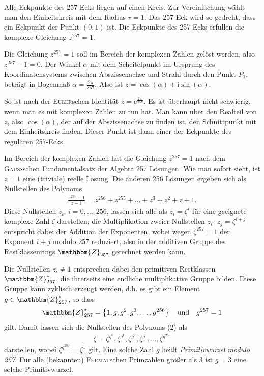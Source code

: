 \documentclass[11pt]{article}
\newcommand{\cbr}[1]{\ensuremath{\left\{#1\right\}}}
\newcommand{\ii}{\mathrm{i}}
\newcommand{\Z}{\mathbbm{Z}}
\begin{document}
Alle Eckpunkte des 257-Ecks liegen auf einen Kreis. Zur Vereinfachung wählt
man den Einheitskreis mit dem Radius $r = 1$. Das 257-Eck wird so gedreht,
dass ein Eckpunkt der Punkt $(0,1)$ ist. Die Eckpunkte des 257-Ecks erfüllen
die komplexe Gleichung $z^{257} = 1$.

Die Gleichung $z^{257} =1$ soll im Bereich der komplexen Zahlen gelöst werden,
also $z^{257} - 1 = 0$. Der Winkel $\alpha$ mit dem Scheitelpunkt im Ursprung
des Koordinatensystems zwischen Abszissenachse und Strahl durch den Punkt
$P_1$, beträgt in Bogenmaß $\alpha= \frac{2\pi}{257}$. Also ist $z =
\cos(\alpha) + \ii\sin(\alpha)$.

So ist nach der \textsc{Euler}schen Identität $z =
\mathrm{e}^{\frac{2\pi\ii}{257}}$.  Es ist überhaupt nicht schwierig, wenn man
es mit komplexen Zahlen zu tun hat. Man kann über den Realteil von $z$, also
$\cos(\alpha)$, der auf der Abszissenachse zu finden ist, den Schnittpunkt mit
dem Einheitskreis finden. Dieser Punkt ist dann einer der Eckpunkte des
regulären 257-Ecks.

Im Bereich der komplexen Zahlen hat die Gleichung $z^{257} = 1$ nach dem
\textsc{Gauss}schen Fundamentalsatz der Algebra 257 Lösungen. Wie man sofort
sieht, ist $z = 1$ eine (triviale) reelle Lösung. Die anderen 256 Lösungen
ergeben sich als Nullstellen des Polynoms
\begin{gather*}
   \frac{z^{257}-1}{z-1}=z^{256}+z^{255}+\ldots+z^3+z^2+z+1.\tag{2}
\end{gather*}
Diese Nullstellen $z_i$, $i=0,\ldots,256$, lassen sich alle als $z_i=\zeta^i$
für eine geeignete komplexe Zahl $\zeta$ darstellen; die Multiplikation zweier
Nullstellen $z_i\cdot z_j=\zeta^{i+j}$ entspricht dabei der Addition der
Exponenten, wobei wegen $\zeta^{257}=1$ der Exponent $i+j$ modulo 257
reduziert, also in der additiven Gruppe des Restklassenrings $\Z_{257}$
gerechnet werden kann.

Die Nullstellen $z_i\neq 1$ entsprechen dabei den primitiven Restklassen
$\Z_{257}^\ast$, die ihrerseits eine endliche multiplikative Gruppe bilden.
Diese Gruppe kann zyklisch erzeugt werden, d.h. es gibt ein Element $g\in
\Z_{257}^\ast$, so dass
\begin{gather*}
  \Z_{257}^\ast=\cbr{1,g,g^2,g^3,\ldots,g^{256}}\quad \text{und}\quad g^{257}=1
\end{gather*}
gilt.  Damit lassen sich die Nullstellen des Polynoms (2) als 
\begin{gather*}
  \zeta = \zeta^{g^0}, \zeta^{g^1}, \zeta^{g^2}, \zeta^{g^3}, \ldots,
  \zeta^{g^{256}}
\end{gather*}
darstellen, wobei $\zeta^{g^{257}} = \zeta^1$ gilt.  Eine solche Zahl $g$
heißt \emph{Primitivwurzel modulo 257}. Für alle (bekannten)
\textsc{Fermat}schen Primzahlen größer als 3 ist $g=3$ eine solche
Primitivwurzel. 
\end{document}
